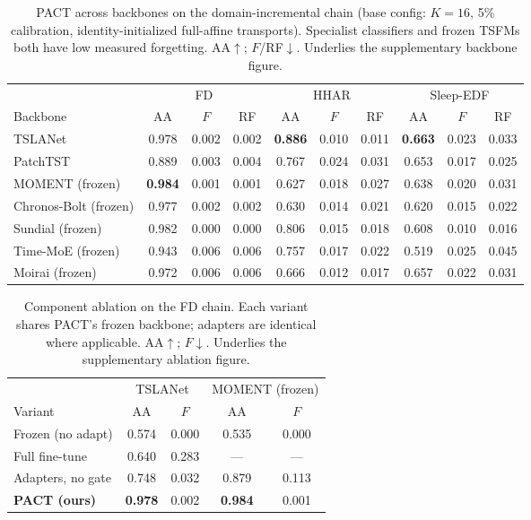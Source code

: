 \begin{table}[t]
\centering
\caption{PACT across backbones on the domain-incremental chain (base config:
$K{=}16$, 5\% calibration, identity-initialized full-affine transports).
Specialist classifiers and
frozen TSFMs both have low measured forgetting. AA$\uparrow$; $F$/RF$\downarrow$.
Underlies the supplementary backbone figure.}
\label{tab:backbones}
\small
\begin{tabular}{l ccc ccc ccc}
\toprule
& \multicolumn{3}{c}{FD} & \multicolumn{3}{c}{HHAR} & \multicolumn{3}{c}{Sleep-EDF}\\
\cmidrule(lr){2-4}\cmidrule(lr){5-7}\cmidrule(lr){8-10}
Backbone & AA & $F$ & RF & AA & $F$ & RF & AA & $F$ & RF\\
\midrule
TSLANet & 0.978 & 0.002 & 0.002 & \textbf{0.886} & 0.010 & 0.011 & \textbf{0.663} & 0.023 & 0.033\\
PatchTST & 0.889 & 0.003 & 0.004 & 0.767 & 0.024 & 0.031 & 0.653 & 0.017 & 0.025\\
MOMENT (frozen) & \textbf{0.984} & 0.001 & 0.001 & 0.627 & 0.018 & 0.027 & 0.638 & 0.020 & 0.031\\
Chronos-Bolt (frozen) & 0.977 & 0.002 & 0.002 & 0.630 & 0.014 & 0.021 & 0.620 & 0.015 & 0.022\\
Sundial (frozen) & 0.982 & 0.000 & 0.000 & 0.806 & 0.015 & 0.018 & 0.608 & 0.010 & 0.016\\
Time-MoE (frozen) & 0.943 & 0.006 & 0.006 & 0.757 & 0.017 & 0.022 & 0.519 & 0.025 & 0.045\\
Moirai (frozen) & 0.972 & 0.006 & 0.006 & 0.666 & 0.012 & 0.017 & 0.657 & 0.022 & 0.031\\
\bottomrule
\end{tabular}
\end{table}

\begin{table}[t]
\centering
\caption{Component ablation on the FD chain. Each variant shares PACT's frozen
backbone; adapters are identical where applicable. AA$\uparrow$; $F$$\downarrow$.
Underlies the supplementary ablation figure.}
\label{tab:components}
\small
\begin{tabular}{l cc cc}
\toprule
& \multicolumn{2}{c}{TSLANet} & \multicolumn{2}{c}{MOMENT (frozen)}\\
\cmidrule(lr){2-3}\cmidrule(lr){4-5}
Variant & AA & $F$ & AA & $F$\\
\midrule
Frozen (no adapt) & 0.574 & 0.000 & 0.535 & 0.000\\
Full fine-tune & 0.640 & 0.283 & --- & ---\\
Adapters, no gate & 0.748 & 0.032 & 0.879 & 0.113\\
\textbf{PACT (ours)} & \textbf{0.978} & 0.002 & \textbf{0.984} & 0.001\\
\bottomrule
\end{tabular}
\end{table}

